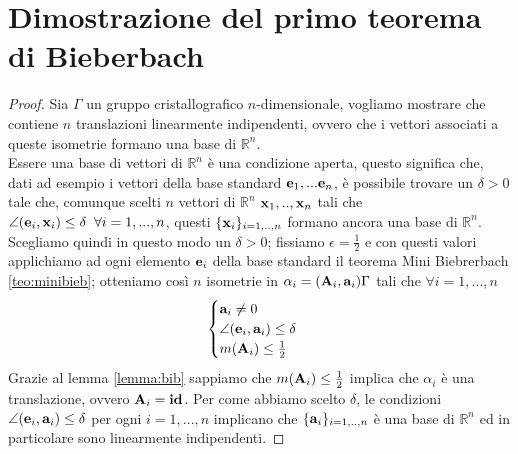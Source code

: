 \documentclass[a4paper,11pt,openright,twoside	]{book}
\begin{document}
\section{Dimostrazione del primo teorema di Bieberbach}
\begin{proof}
Sia $\Gamma$ un gruppo cristallografico $n$-dimensionale, vogliamo mostrare che contiene $n$ translazioni linearmente indipendenti, ovvero che i vettori associati a queste isometrie formano una base di $\mathbb{R}^n$. \\
Essere una base di vettori di $\mathbb{R}^n$ è una condizione aperta, questo significa che, dati ad esempio i vettori della base standard $ \vb{e}_1, ...\vb{e}_n$, è possibile trovare un $\delta>0$  tale che, comunque scelti $n $ vettori di $\mathbb{R}^n$ $\vb{x}_1, .., \vb{x}_n$ tali che $ \angle(\vb{e}_i, \vb{x}_i) \leq \delta   \; \; \forall i = 1, ..., n$, questi $\{\vb{x}_i \}_{i=1,..,n}$ formano ancora una base di $\mathbb{R}^n$.\\
Scegliamo quindi in questo modo un $\delta >0$; fissiamo $\epsilon = \frac{1}{2}$ e con questi valori applichiamo ad ogni elemento $\vb{e}_i$ della base standard il teorema Mini Biebrerbach \ref{teo:minibieb}; otteniamo così $n$ isometrie in $\alpha_i = (\vb{A}_i, \vb{a}_i ) \Gamma$  tali che $\forall i = 1,...,n$
\begin{equation}
\label{ed:ai}
\begin{cases}
\vb{a}_i \neq	0 \\
\angle (\vb{e}_i, \vb{a}_i ) \leq \delta \\
m(\vb{A}_i) \leq \frac{1}{2}
\end{cases}
\end{equation}
Grazie al lemma \ref{lemma:bib} sappiamo che $m(\vb{A}_i) \leq \frac{1}{2}$ implica che $\alpha_i$ è una translazione, ovvero $\vb{A}_i = \vb{id}$. 
Per come abbiamo scelto $\delta$, le condizioni $\angle (\vb{e}_i, \vb{a}_i ) \leq \delta$ per ogni $i= 1,...,n$ implicano che $\{\vb{a}_i \}_{i=1,..,n}$ è una base di $\mathbb{R}^n$ ed in particolare sono linearmente indipendenti.
\end{proof}
\end{document}
